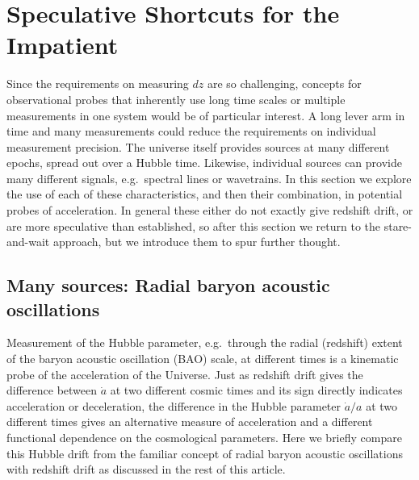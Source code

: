 \documentclass[preprint2, 10pt]{aastex}
\begin{document}
{\section{Speculative Shortcuts for the Impatient} \label{sec:methods} 

Since the requirements on measuring $dz$ are so challenging, 
concepts for observational probes that inherently use long time scales or 
multiple measurements in one system would be of particular interest. 
A long lever arm in time and many measurements could reduce the requirements 
on individual measurement precision.  The universe itself provides sources 
at many different epochs, spread out over a Hubble time.  Likewise, 
individual sources can provide many different signals, e.g.\ spectral lines 
or wavetrains.  In this section we explore the use of each of these 
characteristics, and then their combination, in potential probes of 
acceleration. In general these either do not exactly give redshift drift, 
or are more speculative than established, so after this section we return 
to the stare-and-wait approach, but we introduce them to spur further thought. 


\subsection{Many sources: Radial baryon acoustic oscillations} \label{sec:rbao} 
Measurement of the Hubble parameter, e.g.\ through the radial 
(redshift) extent of the baryon acoustic oscillation (BAO) scale, 
at different times is a kinematic
probe of the acceleration of the Universe. Just as redshift drift gives the difference
between $\dot{a}$ at two different cosmic times and its sign directly indicates
acceleration or deceleration, the difference in the Hubble parameter $\dot{a}/a$
at two different times gives an alternative measure of acceleration
and a different functional dependence on the cosmological parameters.
Here we briefly compare this Hubble drift from the 
familiar concept of radial baryon acoustic oscillations 
with redshift drift as discussed in the rest of this article.

}
\end{document}
